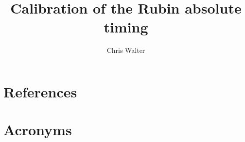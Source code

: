 \documentclass[SE,authoryear,toc]{lsstdoc}
\title{Calibration of the Rubin absolute timing}
\author{%
Chris Walter
}
\date{\vcsDate}
\begin{document}
\maketitle


\appendix
\section{References} \label{sec:bib}
\renewcommand{\refname}{} %


\section{Acronyms} \label{sec:acronyms}

\end{document}
